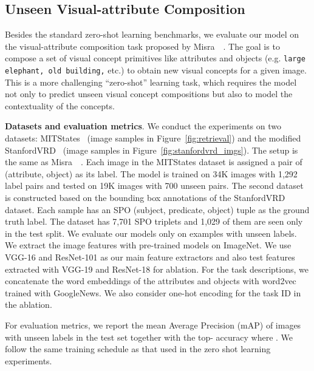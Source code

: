 \documentclass[10pt,twocolumn,letterpaper]{article}
\newcommand\minisection[1]{\vspace{2mm}\noindent \textbf{#1}}
\begin{document}
\subsection{Unseen Visual-attribute Composition}
\label{sec:concept}
Besides the standard zero-shot learning benchmarks, we evaluate our model on the visual-attribute composition task proposed by Misra~\etal~\cite{misra2017red}. The goal is to compose a set of visual concept primitives like attributes 
and objects (e.g. \texttt{large elephant, old building,} etc.) to obtain new visual concepts for a given image. This is a more challenging ``zero-shot'' learning task,  which requires the model not only to predict unseen visual concept compositions but also to model the contextuality of the concepts. 



\minisection{Datasets and evaluation metrics}. We conduct the experiments on two
datasets: MITStates~\cite{StatesAndTransformations} (image samples in Figure~\ref{fig:retrieval}) and
the modified StanfordVRD~\cite{lu2016visual} (image samples in Figure~\ref{fig:stanfordvrd_imgs}). The setup is the same as Misra~\etal~\cite{misra2017red}.
Each image in the MITStates dataset is assigned a pair of (attribute, object) as
its label. The model is trained on 34K images with 1,292 label pairs and tested on
19K images with 700 unseen pairs. The second dataset is constructed based on 
the bounding box annotations of the StanfordVRD dataset. Each sample has an SPO (subject, predicate, object)
tuple as the ground truth label.  The dataset has 7,701 SPO triplets and 1,029 of them
are seen only in the test split. We evaluate our models only on examples with unseen
labels. We extract the image features with
pre-trained models on ImageNet. We use VGG-16 and ResNet-101 as our main
feature extractors and also test features extracted 
with VGG-19 and ResNet-18 for ablation. 
For the task descriptions, we concatenate the word embeddings of the attributes
and objects with word2vec~\cite{mikolov2013efficient} trained with GoogleNews. We also consider one-hot encoding for the task ID in the ablation. 

For evaluation metrics, we report the mean Average Precision (mAP) of images 
with unseen labels in the test set together with the top- accuracy where
. We follow the same training schedule as that used in the zero shot learning experiments.
\end{document}
